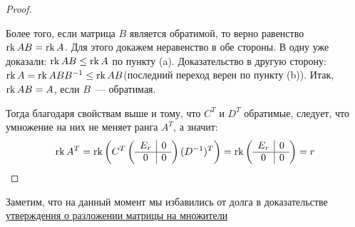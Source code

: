 \begin{proof}
\begin{enumerate}
\begin{enumerate}
            \end{enumerate}
            Более того, если матрица $B$ является обратимой, то верно равенство $\operatorname{rk} AB = \operatorname{rk} A$.
            Для этого докажем неравенство в обе стороны. В одну уже доказали: $\operatorname{rk} AB \le \operatorname{rk} A$ по пункту (a).
            Доказательство в другую сторону: $\operatorname{rk} A = \operatorname{rk} ABB^{-1} \le \operatorname{rk} AB$(последний переход верен по пункту (b)).
            Итак, $\operatorname{rk} AB = A$, если $B$~--- обратимая.
    \end{enumerate}
    Тогда благодаря свойствам выше и тому, что $C^T$ и $D^T$ обратимые, следует, что умножение на них не 
    меняет ранга $A^T$, а значит:
    \[
        \operatorname{rk} A^T = \operatorname{rk} \left(C^T
        \left(\begin{array}{c|c}
                E_r & 0\\
                \hline
                0 & 0
        \end{array}\right) (D^{-1})^T\right) = 
        \operatorname{rk} \left(\begin{array}{c|c}
                E_r & 0\\
                \hline
                0 & 0
        \end{array}\right) = r
    \]
\end{proof}
\begin{remark}
    Заметим, что на данный момент мы избавились от долга в 
    доказательстве 
    \hyperref[stm:О разложении матрицы на множители]{утверждения о разложении матрицы на множители}
\end{remark}
